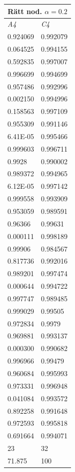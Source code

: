 \documentclass[a4paper,10pt]{article}
\begin{document}
\begin{centering}
{%
\begin{tabular}{| l | l| }
\hline
\multicolumn{2}{|c|}{Rätt nod. $\alpha=0.2$ }\\ \hline
\emph{A4} & \emph{C4} \\ \hline
0.924069  & 0.992079\\ \hline
0.064525  & 0.994155\\ \hline
0.592835  & 0.997007\\ \hline
0.996699  & 0.994699\\ \hline
0.957486  & 0.992996\\ \hline
0.002150  & 0.994996\\ \hline
0.158563  & 0.997109\\ \hline
0.955309  & 0.991146\\ \hline
6.41E-05  & 0.995466\\ \hline
0.999603  & 0.996711\\ \hline
0.9928    & 0.990002\\ \hline
0.989372  & 0.994965\\ \hline
6.12E-05  & 0.997142\\ \hline
0.999558  & 0.993909\\ \hline
0.953059  & 0.989591\\ \hline
0.96366   & 0.99631\\ \hline
0.000111  & 0.998189\\ \hline
0.99906   & 0.984567\\ \hline
0.817736  & 0.992016\\ \hline
0.989201  & 0.997474\\ \hline
0.000644  & 0.994722\\ \hline
0.997747  & 0.989485\\ \hline
0.999029  & 0.99505\\ \hline
0.972834  & 0.9979\\ \hline
0.969881  & 0.993137\\ \hline
0.000300  & 0.990682\\ \hline
0.996966  & 0.99479\\ \hline
0.960684  & 0.995993\\ \hline
0.973331  & 0.996948\\ \hline
0.041084  & 0.993572\\ \hline
0.892258  & 0.991648\\ \hline
0.972593  & 0.995818\\ \hline\hline
0.691664  & 0.994071\\ \hline
23 & 32\\ \hline
71.875 & 100 \\ \hline
\end{tabular}

}
\end{centering}
\end{document}
